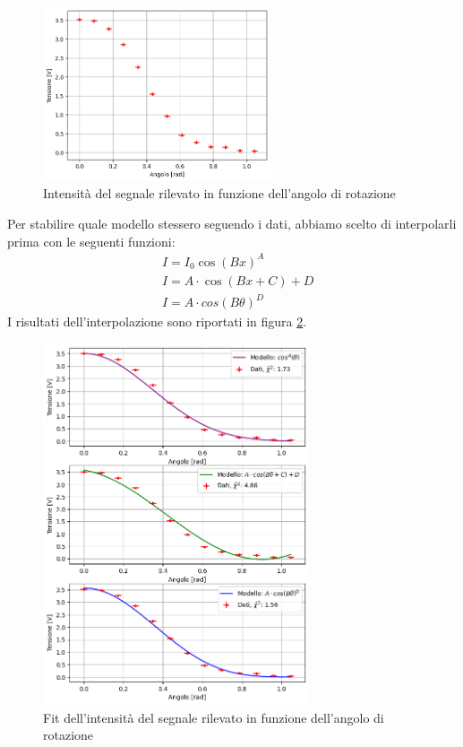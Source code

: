 \documentclass[letterpaper,12pt]{article}
\begin{document}
\begin{figure}[h]
    \centering
    \includegraphics[width = 0.6\textwidth]{dati_rotazione.png}
    \caption{Intensità del segnale rilevato in funzione dell'angolo di rotazione}
    \label{fig:rotazione}
\end{figure}

Per stabilire quale modello stessero seguendo i dati, abbiamo scelto di interpolarli prima con le seguenti funzioni:
\begin{align*}
    & I = I_0\cos(Bx)^A \\
    & I = A\cdot\cos(Bx + C) + D \\
    & I = A\cdot cos(B\theta)^D
\end{align*} 
I risultati dell'interpolazione sono riportati in figura \ref{fig:fit_rotazione}.

\begin{figure}[h!]
    \centering
    \includegraphics[width = 0.7\textwidth]{fit_rotazione.png}
    \caption{Fit dell'intensità del segnale rilevato in funzione dell'angolo di rotazione}
    \label{fig:fit_rotazione}
\end{figure}
\end{document}
